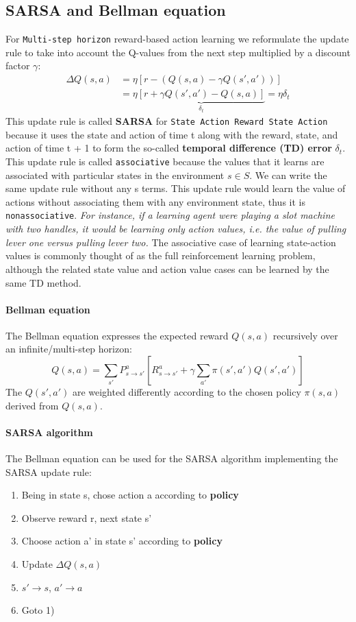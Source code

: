 \documentclass[11pt]{article}
\begin{document}
\subsection{SARSA and Bellman equation}
For \texttt{Multi-step horizon} reward-based action learning we reformulate the update rule to take into account the Q-values from the next step multiplied by a discount factor $\gamma$:
\begin{align*}
	\Delta Q(s,a) &= \eta \left[r-(Q(s,a) - \gamma Q(s', a'))\right]\\
&=\eta \underbrace{\left[r+\gamma Q(s', a')-Q(s,a)\right]}_{\delta_t}= \eta \delta_t
\end{align*}
This update rule is called \textbf{SARSA} for \texttt{State Action Reward State Action} because it uses the state and action of time t along with the reward, state, and action of time t + 1 to form the so-called \textbf{temporal difference (TD) error} $\delta_t$.
This update rule is called \texttt{associative} because the values that it learns are associated with particular states in the environment $s \in S$. We can write the same update rule without any s terms. This update rule would learn the value of actions without associating them with any environment state, thus it is \texttt{nonassociative}. \textit{For instance, if a learning agent were playing a slot machine with two handles, it would be learning only action values, i.e. the value of pulling lever one versus pulling lever two.} The associative case of learning state-action values is commonly thought of as the full reinforcement learning problem, although the related state value and action value cases can be learned by the same TD method.

\paragraph{Bellman equation}
The Bellman equation expresses the expected reward $Q(s,a)$ recursively over an infinite/multi-step horizon: 
\[
	Q(s,a) = \sum_{s'}P_{s \rightarrow s'}^a [R^a_{s \rightarrow s'} + \gamma \sum_{a'} \pi(s',a')Q(s',a')]
\]
The $Q(s',a')$ are weighted differently according to the chosen policy $\pi(s,a)$ derived from $Q(s,a)$.

\paragraph{SARSA algorithm}
The Bellman equation can be used for the SARSA algorithm implementing the SARSA update rule:
\begin{enumerate}
	\item Being in state s, chose action a according to \textbf{policy}
	\item Observe reward r, next state s'
	\item Choose action a' in state s' according to \textbf{policy}
	\item Update $\Delta Q(s,a)$
	\item $s' \rightarrow s$, $a' \rightarrow a$
	\item Goto 1)
\end{enumerate}
\end{document}

